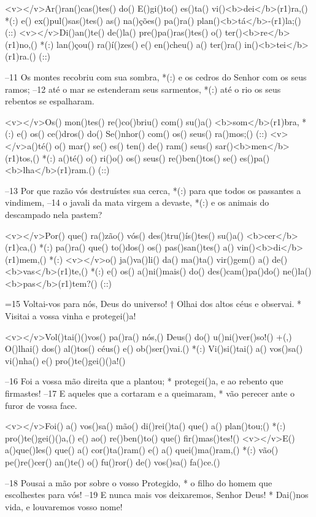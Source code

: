 <v></v>Ar()ran()cas()tes() do() E()gi()to() es()ta() vi()<b>dei</b>(r1)ra,() *(:)
e() ex()pul()sas()tes() as() na()ções() pa()ra() plan()<b>tá</b>-(r1)la;() (::)
<v></v>Di()an()te() de()la() pre()pa()ras()tes() o() ter()<b>re</b>(r1)no,() *(:)
lan()çou() ra()í()zes() e() en()cheu() a() ter()ra() in()<b>tei</b>(r1)ra.() (::)

–11 Os montes recobriu com sua sombra, *(:)
e os cedros do Senhor com os seus ramos;
–12 até o mar se estenderam seus sarmentos, *(:)
até o rio os seus rebentos se espalharam.

<v></v>Os() mon()tes() re()co()briu() com() su()a() <b>som</b>(r1)bra, *(:)
e() os() ce()dros() do() Se()nhor() com() os() seus() ra()mos;() (::)
<v></v>a()té() o() mar() se() es() ten() de() ram() seus() sar()<b>men</b>(r1)tos,() *(:)
a()té() o() ri()o() os() seus() re()ben()tos() se() es()pa()<b>lha</b>(r1)ram.() (::)

–13 Por que razão vós destruístes sua cerca, *(:)
para que todos os passantes a vindimem,
–14 o javali da mata virgem a devaste, *(:)
e os animais do descampado nela pastem?

<v></v>Por() que() ra()zão() vós() des()tru()ís()tes() su()a() <b>cer</b>(r1)ca,() *(:)
pa()ra() que() to()dos() os() pas()san()tes() a() vin()<b>di</b>(r1)mem,() *(:)
<v></v>o() ja()va()li() da() ma()ta() vir()gem() a() de()<b>vas</b>(r1)te,() *(:)
e() os() a()ni()mais() do() des()cam()pa()do() ne()la() <b>pas</b>(r1)tem?() (::)

=15 Voltai-vos para nós, Deus do universo! †
Olhai dos altos céus e observai. *
Visitai a vossa vinha e protegei()a!

<v></v>Vol()tai()()vos() pa()ra() nós,() Deus() do() u()ni()ver()so!() +(,)
O()lhai() dos() al()tos() céus() e() ob()ser()vai.() *(:)
Vi()si()tai() a() vos()sa() vi()nha() e() pro()te()gei()()a!()

–16 Foi a vossa mão direita que a plantou; *
protegei()a, e ao rebento que firmastes!
–17 E aqueles que a cortaram e a queimaram, *
vão perecer ante o furor de vossa face.

<v></v>Foi() a() vos()sa() mão() di()rei()ta() que() a() plan()tou;() *(:)
pro()te()gei()()a,() e() ao() re()ben()to() que() fir()mas()tes!()
<v></v>E() a()que()les() que() a() cor()ta()ram() e() a() quei()ma()ram,() *(:)
vão() pe()re()cer() an()te() o() fu()ror() de() vos()sa() fa()ce.()

–18 Pousai a mão por sobre o vosso Protegido, *
o filho do homem que escolhestes para vós!
–19 E nunca mais vos deixaremos, Senhor Deus! *
Dai()nos vida, e louvaremos vosso nome!

